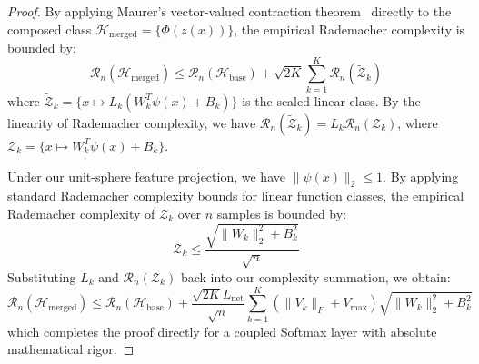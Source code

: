 \begin{proof}
By applying Maurer's vector-valued contraction theorem~\cite{maurer2016vector} directly to the composed class $\mathcal{H}_{\text{merged}} = \{ \Phi(z(x)) \}$, the empirical Rademacher complexity is bounded by:
\begin{equation}
    \mathcal{R}_n(\mathcal{H}_{\text{merged}}) \le \mathcal{R}_n(\mathcal{H}_{\text{base}}) + \sqrt{2K} \sum_{k=1}^K \mathcal{R}_n(\tilde{\mathcal{Z}}_k)
\end{equation}
where $\tilde{\mathcal{Z}}_k = \{ x \mapsto L_k (W_k^T \psi(x) + B_k) \}$ is the scaled linear class. By the linearity of Rademacher complexity, we have $\mathcal{R}_n(\tilde{\mathcal{Z}}_k) = L_k \mathcal{R}_n(\mathcal{Z}_k)$, where $\mathcal{Z}_k = \{ x \mapsto W_k^T \psi(x) + B_k \}$.

Under our unit-sphere feature projection, we have $\|\psi(x)\|_2 \le 1$. By applying standard Rademacher complexity bounds for linear function classes, the empirical Rademacher complexity of $\mathcal{Z}_k$ over $n$ samples is bounded by:
\begin{equation}
    \mathcal{Z}_k \le \frac{\sqrt{\|W_k\|_2^2 + B_k^2}}{\sqrt{n}}
\end{equation}
Substituting $L_k$ and $\mathcal{R}_n(\mathcal{Z}_k)$ back into our complexity summation, we obtain:
\begin{equation}
    \mathcal{R}_n(\mathcal{H}_{\text{merged}}) \le \mathcal{R}_n(\mathcal{H}_{\text{base}}) + \frac{\sqrt{2K} L_{\text{net}}}{\sqrt{n}} \sum_{k=1}^K \left( \|V_k\|_F + V_{\max} \right) \sqrt{\|W_k\|_2^2 + B_k^2}
\end{equation}
which completes the proof directly for a coupled Softmax layer with absolute mathematical rigor.
\end{proof}

